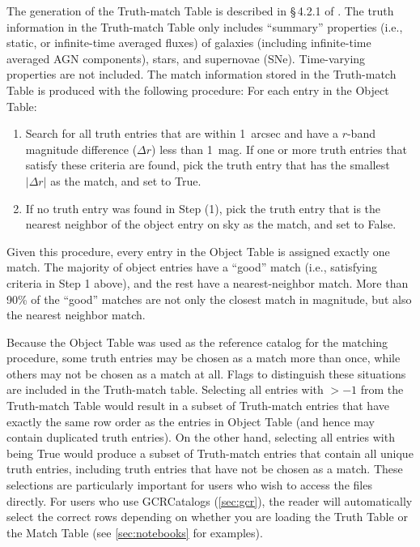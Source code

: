 \documentclass[11pt]{report}
\begin{document}
The generation of the Truth-match Table is described in \S\,4.2.1 of \cite{2020arXiv201005926L}. The truth information in the Truth-match Table only includes ``summary'' properties (i.e., static, or infinite-time averaged fluxes) of galaxies (including infinite-time averaged AGN components), stars, and supernovae (SNe). Time-varying properties are not included. The match information stored in the  Truth-match Table is produced with the following procedure: For each entry in the Object Table:
\begin{enumerate}
    \item Search for all truth entries that are within 1~arcsec and have a $r$-band magnitude difference ($\Delta r$) less than 1~mag. If one or more truth entries that satisfy these criteria are found, pick the truth entry that has the smallest $|\Delta r|$ as the match, and set  to True.
    \item If no truth entry was found in Step (1), pick the truth entry that is the nearest neighbor of the object entry on sky as the match, and set  to False.
\end{enumerate}
Given this procedure, every entry in the Object Table is assigned exactly one match. The majority of object entries have a ``good'' match (i.e., satisfying criteria in Step 1 above), and the rest have a nearest-neighbor match. More than 90\% of the ``good'' matches are not only the closest match in magnitude, but also the nearest neighbor match. 

Because the Object Table was used as the reference catalog for the matching procedure, some truth entries may be chosen as a match more than once, while others may not be chosen as a match at all.
Flags to distinguish these situations are included in the Truth-match table. 
Selecting all entries with  $> -1$ from the Truth-match Table would result in a subset of Truth-match entries that have exactly the same row order as the entries in Object Table (and hence may contain duplicated truth entries). On the other hand, selecting all entries with  being True would produce a subset of Truth-match entries that contain all unique truth entries, including truth entries that have not be chosen as a match.
These selections are particularly important for users who wish to access the files directly. For users who use GCRCatalogs (\autoref{sec:gcr}), the reader will automatically select the correct rows depending on whether you are loading the Truth Table or the Match Table (see \autoref{sec:notebooks} for examples).
\end{document}
